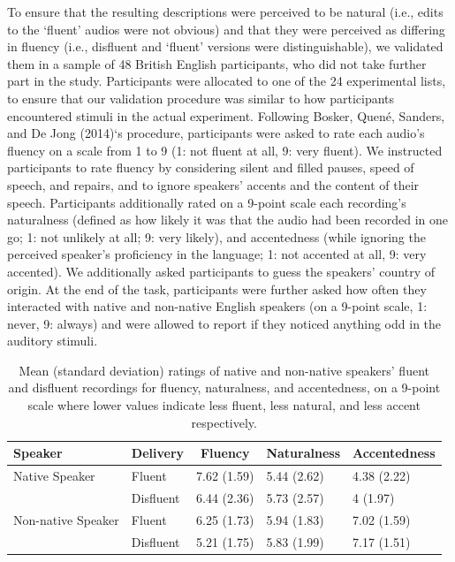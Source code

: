 \documentclass[
  man,floatsintext]{apa7}
\begin{document}
To ensure that the resulting descriptions were perceived to be natural (i.e., edits to the `fluent' audios were not obvious) and that they were perceived as differing in fluency (i.e., disfluent and `fluent' versions were distinguishable), we validated them in a sample of 48 British English participants, who did not take further part in the study. Participants were allocated to one of the 24 experimental lists, to ensure that our validation procedure was similar to how participants encountered stimuli in the actual experiment. Following Bosker, Quené, Sanders, and De Jong (2014)`s procedure, participants were asked to rate each audio's fluency on a scale from 1 to 9 (1: not fluent at all, 9: very fluent). We instructed participants to rate fluency by considering silent and filled pauses, speed of speech, and repairs, and to ignore speakers' accents and the content of their speech. Participants additionally rated on a 9-point scale each recording's naturalness (defined as how likely it was that the audio had been recorded in one go; 1: not unlikely at all; 9: very likely), and accentedness (while ignoring the perceived speaker's proficiency in the language; 1: not accented at all, 9: very accented). We additionally asked participants to guess the speakers' country of origin. At the end of the task, participants were further asked how often they interacted with native and non-native English speakers (on a 9-point scale, 1: never, 9: always) and were allowed to report if they noticed anything odd in the auditory stimuli.

\begin{table}[tbp]

\begin{center}
\begin{threeparttable}

\caption{\label{tab:tab-results-validation}Mean (standard deviation) ratings of native and non-native speakers’ fluent and disfluent
recordings for fluency, naturalness, and accentedness, on a 9-point scale where lower values indicate
less fluent, less natural, and less accent respectively.}

\begin{tabular}{lllll}
\toprule
Speaker & \multicolumn{1}{c}{Delivery} & \multicolumn{1}{c}{Fluency} & \multicolumn{1}{c}{Naturalness} & \multicolumn{1}{c}{Accentedness}\\
\midrule
Native Speaker & Fluent & 7.62 (1.59) & 5.44 (2.62) & 4.38 (2.22)\\
 & Disfluent & 6.44 (2.36) & 5.73 (2.57) & 4 (1.97)\\
Non-native Speaker & Fluent & 6.25 (1.73) & 5.94 (1.83) & 7.02 (1.59)\\
 & Disfluent & 5.21 (1.75) & 5.83 (1.99) & 7.17 (1.51)\\
\bottomrule
\end{tabular}

\end{threeparttable}
\end{center}

\end{table}
\end{document}
